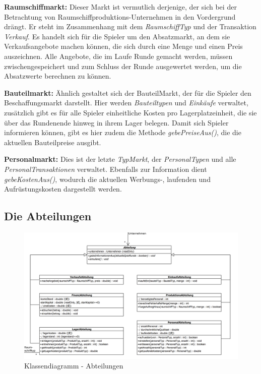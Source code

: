 \begin{seList}
\item \textbf{Raumschiffmarkt:} Dieser Markt ist vermutlich derjenige, der sich bei der Betrachtung von Raumschiffproduktions-Unternehmen in den Vordergrund drängt. Er steht im Zusammenhang mit dem \textit{RaumschiffTyp} und der Transaktion \textit{Verkauf}. Es handelt sich für die Spieler um den Absatzmarkt, an dem sie Verkaufsangebote machen können, die sich durch eine Menge und einen Preis auszeichnen. Alle Angebote, die im Laufe Runde gemacht werden, müssen zwischengespeichert und zum Schluss der Runde ausgewertet werden, um die Absatzwerte berechnen zu können.
\item \textbf{Bauteilmarkt:} Ähnlich gestaltet sich der BauteilMarkt, der für die Spieler den Beschaffungsmarkt darstellt. Hier werden \textit{Bauteiltypen} und \textit{Einkäufe} verwaltet, zusätzlich gibt es für alle Spieler einheitliche Kosten pro Lagerplatzeinheit, die sie über das Rundenende hinweg in ihrem Lager belegen. Damit sich Spieler informieren können, gibt es hier zudem die Methode \textit{gebePreiseAus()}, die die aktuellen Bauteilpreise ausgibt.
\item \textbf{Personalmarkt:} Dies ist der letzte \textit{TypMarkt}, der \textit{PersonalTypen} und alle \textit{PersonalTransaktionen} verwaltet. Ebenfalls zur Information dient \textit{gebeKostenAus()}, wodurch die aktuellen Werbungs-, laufenden und Aufrüstungskosten dargestellt werden.
\end{seList}

\subsection{Die Abteilungen}
\begin{figure}[htb]
     \centering
     \includegraphics[width=\textwidth]{30_Fachkonzept/20_Entwurf/abteilung}
     \caption{Klassendiagramm - Abteilungen}
     \label{img:fachkonzept-entwurf-abteilung}
\end{figure}

